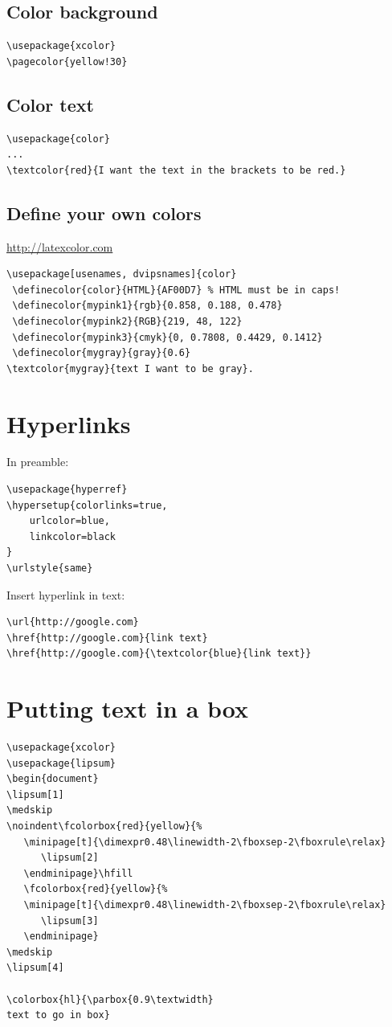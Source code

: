 \documentclass{article}
\begin{document}
\begin{minipage}{0.5\textwidth}
\subsection{Color background }
\begin{verbatim}
\usepackage{xcolor}
\pagecolor{yellow!30}
\end{verbatim}

\subsection{Color text}
\begin{verbatim}
\usepackage{color}
...
\textcolor{red}{I want the text in the brackets to be red.}
\end{verbatim}
\end{minipage}
\begin{minipage}{0.5\textwidth}
\subsection{Define your own colors}\label{definecolors}
\url{http://latexcolor.com}
\begin{verbatim}
\usepackage[usenames, dvipsnames]{color}
 \definecolor{color}{HTML}{AF00D7} % HTML must be in caps!
 \definecolor{mypink1}{rgb}{0.858, 0.188, 0.478}
 \definecolor{mypink2}{RGB}{219, 48, 122}
 \definecolor{mypink3}{cmyk}{0, 0.7808, 0.4429, 0.1412}
 \definecolor{mygray}{gray}{0.6}
\textcolor{mygray}{text I want to be gray}.
\end{verbatim}
\end{minipage}

\section{Hyperlinks}
In preamble:
\begin{verbatim}
\usepackage{hyperref}
\hypersetup{colorlinks=true,
    urlcolor=blue,
    linkcolor=black
}
\urlstyle{same}
\end{verbatim}

Insert hyperlink in text:
\begin{verbatim}
\url{http://google.com}
\href{http://google.com}{link text}
\href{http://google.com}{\textcolor{blue}{link text}}
\end{verbatim}

\section{Putting text in a box}
\begin{verbatim}
\usepackage{xcolor}
\usepackage{lipsum}
\begin{document}
\lipsum[1]
\medskip
\noindent\fcolorbox{red}{yellow}{%
   \minipage[t]{\dimexpr0.48\linewidth-2\fboxsep-2\fboxrule\relax}
      \lipsum[2]
   \endminipage}\hfill
   \fcolorbox{red}{yellow}{%
   \minipage[t]{\dimexpr0.48\linewidth-2\fboxsep-2\fboxrule\relax}
      \lipsum[3]
   \endminipage}
\medskip
\lipsum[4]

\colorbox{hl}{\parbox{0.9\textwidth}
text to go in box}
\end{verbatim}
\end{document}
